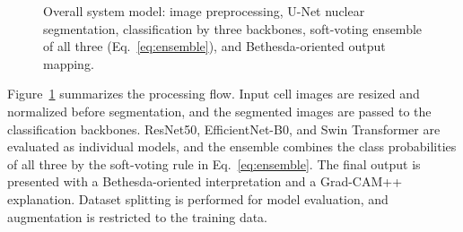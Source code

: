 \documentclass[runningheads]{llncs}
\begin{document}
\begin{figure}[t]
\centering
{}
\caption{Overall system model: image preprocessing, U-Net nuclear segmentation, classification by three backbones, soft-voting ensemble of all three (Eq.~\ref{eq:ensemble}), and Bethesda-oriented output mapping.}
\label{fig:pipeline}
\end{figure}

Figure~\ref{fig:pipeline} summarizes the processing flow. Input cell images are resized and normalized before segmentation, and the segmented images are passed to the classification backbones. ResNet50, EfficientNet-B0, and Swin Transformer are evaluated as individual models, and the ensemble combines the class probabilities of all three by the soft-voting rule in Eq.~\ref{eq:ensemble}. The final output is presented with a Bethesda-oriented interpretation and a Grad-CAM++ explanation. Dataset splitting is performed for model evaluation, and augmentation is restricted to the training data.
\end{document}
